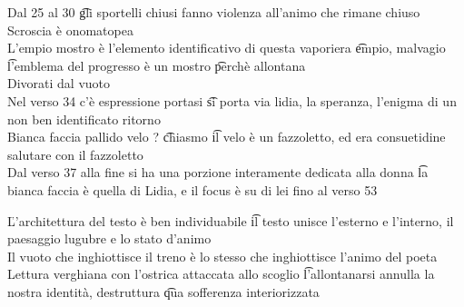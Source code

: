 \documentclass[12pt]{article}
\begin{document}
Dal 25 al 30 \t gli sportelli chiusi fanno violenza all'animo che rimane chiuso \\
Scroscia è onomatopea \\
L'empio mostro è l'elemento identificativo di questa vaporiera \t empio, malvagio \t l'emblema del progresso è un mostro \t perchè allontana \\
Divorati dal vuoto \\
Nel verso 34 c'è espressione portasi \t si porta via lidia, la speranza, l'enigma di un non ben identificato ritorno \\
Bianca faccia pallido velo ? \t chiasmo \t il velo è un fazzoletto, ed era consuetidine salutare con il fazzoletto \\
Dal verso 37 alla fine si ha una porzione interamente dedicata alla donna \t la bianca faccia è quella di Lidia, e il focus è su di lei fino al verso 53

\v

L'architettura del testo è ben individuabile \t il testo unisce l'esterno e l'interno, il paesaggio lugubre e lo stato d'animo \\
Il vuoto che inghiottisce il treno è lo stesso che inghiottisce l'animo del poeta \\
Lettura verghiana con l'ostrica attaccata allo scoglio \t l'allontanarsi annulla la nostra identità, destruttura \t qua sofferenza interiorizzata
\end{document}
